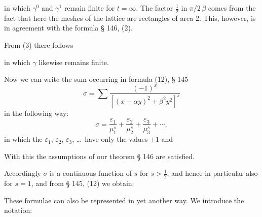 

in which $\gamma^0$ and $\gamma^1$ remain finite for $t=\infty$. The factor $\frac{1}{2}$ in
$\pi/2\,\beta$ comes from the fact that here the meshes of the lattice are rectangles of area 2.
This, however, is in agreement with the formula § 146, (2).

From (3) there follows


in which $\gamma$ likewise remains finite.

Now we can write the sum occurring in formula (12), § 145
\[
\sigma = \sum \frac{(-1)^x}{[(x-\alpha y)^2 + \beta^2 y^2]^s}
\]
in the following way:
\[
\sigma = \frac{\varepsilon_1}{\mu_1^s} + \frac{\varepsilon_2}{\mu_2^s} + \frac{\varepsilon_3}{\mu_3^s} + \cdots,
\]
in which the $\varepsilon_1$, $\varepsilon_2$, $\varepsilon_3$, \dots\ have only the values $\pm 1$ and


With this the assumptions of our theorem § 146 are satisfied.

Accordingly $\sigma$ is a continuous function of $s$ for $s > \frac{1}{2}$, and hence in
particular also for $s=1$, and from § 145, (12) we obtain:

These formulae can also be represented in yet another way. We introduce the notation:

